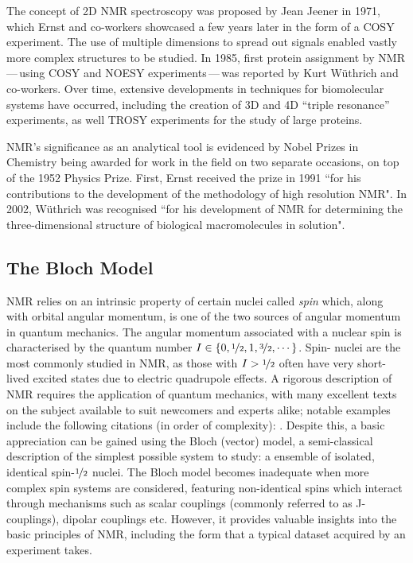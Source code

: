 The concept of \ac{2D} \ac{NMR} spectroscopy was proposed by Jean Jeener in
1971\cite{Jeener1971, Jeener2016}, which Ernst and co-workers showcased a few
years later in the form of a \ac{COSY} experiment\cite{Aue1976a}. The use of
multiple dimensions to spread out signals enabled vastly more complex
structures to be studied. In 1985, first protein assignment by
\ac{NMR}\,---\,using \ac{COSY} and \ac{NOESY} experiments\,---\,was reported
by Kurt W\"uthrich and co-workers\cite{Williamson1985}. Over time, extensive
developments in techniques for biomolecular systems have occurred, including
the creation of 3D and 4D ``triple resonance'' experiments\cite{Marion1989,
Kay1990}, as well \ac{TROSY} experiments\cite{Pervushin1997} for the study of
large proteins.

\ac{NMR}'s significance as an analytical tool is evidenced by Nobel Prizes in
Chemistry being awarded for work in the field on two separate occasions, on top
of the 1952 Physics Prize. First,
Ernst received the prize in 1991 ``for his contributions to the development of
the methodology of high resolution \acl{NMR}"\cite{Ernst1992}. In 2002,
W\"uthrich was recognised ``for his development of \acl{NMR} for determining
the three-dimensional structure of biological macromolecules in
solution"\cite{Wuthrich2003}.

\subsection{The Bloch Model}

\ac{NMR} relies on an intrinsic property of certain nuclei called \textit{spin}
which, along with orbital angular momentum, is one of the two sources of
angular momentum in quantum mechanics.
The angular momentum associated with a nuclear spin is characterised by the
quantum number $I \in \lbrace 0, \nicefrac{1}{2}, 1, \nicefrac{3}{2}, \cdots
\rbrace$. Spin-
nuclei are the most commonly studied in \ac{NMR}, as those with $I >
\nicefrac{1}{2}$ often have very short-lived excited states due to electric
quadrupole effects. A rigorous description of \ac{NMR} requires the application
of quantum mechanics, with many excellent texts on the subject available to
suit newcomers and experts alike; notable examples include the
following citations (in order of complexity):
\cite{Hore2015,Levitt2007,Cavanagh2007,Goldman1988,Abragam1961}.
Despite this, a basic
appreciation can be gained using the Bloch (vector) model, a semi-classical
description of the simplest possible system to study: a ensemble of
isolated, identical spin-$\nicefrac{1}{2}$ nuclei\cite[Chapter 1]{Hore2015}.
The Bloch model becomes inadequate when more complex spin systems are
considered, featuring non-identical spins which interact through mechanisms
such as scalar couplings (commonly referred to as J-couplings), dipolar
couplings etc. However, it provides valuable insights into the basic principles
of \ac{NMR}, including the form that a typical dataset acquired by an
experiment takes.

